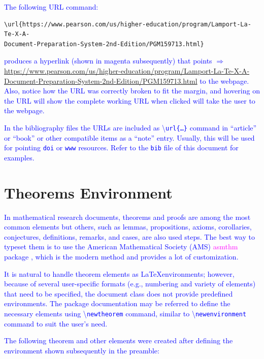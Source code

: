 \documentclass[phd,showgrids]{ndsu-thesis-2022}
\newcommand\italk[1]{\textcolor{blue}{#1}}  %
\newcommand\cmd[1]{\textbackslash\texttt{#1}}  %
\begin{document}
\italk{The following URL command:} 
\vspace{-2ex}
\begin{verbatim}
\url{https://www.pearson.com/us/higher-education/program/Lamport-La-Te-X-A-
Document-Preparation-System-2nd-Edition/PGM159713.html}
\end{verbatim}

\noindent \italk{produces a hyperlink (shown in magenta subsequently) that points $\Rightarrow$ }\textcolor{magenta}{\url{https://www.pearson.com/us/higher-education/program/Lamport-La-Te-X-A-Document-Preparation-System-2nd-Edition/PGM159713.html}} \italk{to the webpage. Also, notice how the URL was correctly broken to fit the margin, and hovering on the URL will show the complete working URL when clicked will take the user to the webpage.}

\italk{In the bibliography files the URLs are included as \cmd{url\{\ldots\}} command in ``article'' or ``book'' or other compatible items as a ``note'' entry. Usually, this will be used for pointing \texttt{doi} or \texttt{www} resources. Refer to the \texttt{bib} file of this document for examples. } 

\section{Theorems Environment}

\italk{In mathematical research documents, theorems and proofs are among the most common elements but others, such as lemmas, propositions, axioms, corollaries, conjectures, definitions, remarks, and cases, are also used steps. The best way to typeset them is to use the American Mathematical Society (AMS) \textcolor{magenta}{asmthm} package \citep{amsthm2017}, which is the modern method and provides a lot of customization.} 

\italk{It is natural to handle theorem elements as \LaTeX environments; however, because of several user-specific formats (e.g., numbering and variety of elements) that need to be specified, the document class does not provide predefined environments. The package documentation may be referred to define the necessary elements using \cmd{newtheorem} command, similar to \cmd{newenvironment} command to suit the user's need.} 

\italk{The following theorem and other elements were created after defining the environment shown subsequently in the preamble:}
\end{document}
